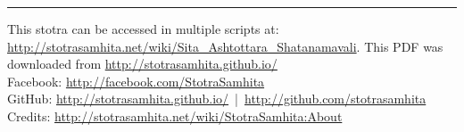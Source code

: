 \documentclass[a5paper,twoside,12pt]{book}
\begin{document}
\setmainfont[Script=Devanagari,Mapping=tex-text]{Sanskrit 2003}
\fontsize {16}{19.25}\selectfont
\begin{center}

\end{center}
\vfill
\hrule
\footnotesize
{}
\noindent\textsf{This stotra can be accessed in multiple scripts at:\\
\url{http://stotrasamhita.net/wiki/Sita_Ashtottara_Shatanamavali}. This PDF was downloaded from \url{http://stotrasamhita.github.io/}\\[1ex]
Facebook: \url{http://facebook.com/StotraSamhita}\\[0.7ex]
GitHub: \url{http://stotrasamhita.github.io/}~|~\url{http://github.com/stotrasamhita}\\[0.7ex]
Credits: \url{http://stotrasamhita.net/wiki/StotraSamhita:About}}
\end{document}
